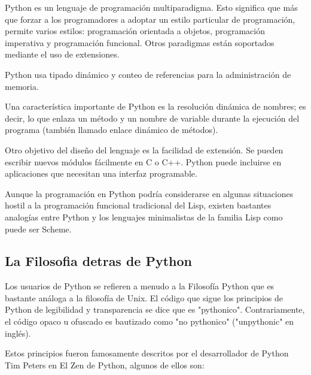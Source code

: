 Python es un lenguaje de programación multiparadigma. Esto significa que más
que forzar a los programadores a adoptar un estilo particular de programación,
permite varios estilos: programación orientada a objetos, programación imperativa
y programación funcional. Otros paradigmas están soportados mediante el uso
de extensiones.

Python usa tipado dinámico y conteo de referencias para la administración
de memoria.

Una característica importante de Python es la resolución dinámica de nombres;
 es decir, lo que enlaza un método y un nombre de variable durante la ejecución
  del programa (también llamado enlace dinámico de métodos).
  
Otro objetivo del diseño del lenguaje es la facilidad de extensión. Se pueden
escribir nuevos módulos fácilmente en C o C++. Python puede incluirse en
aplicaciones que necesitan una interfaz programable.

Aunque la programación en Python podría considerarse en algunas situaciones
hostil a la programación funcional tradicional del Lisp, existen bastantes
analogías entre Python y los lenguajes minimalistas de la familia Lisp como
puede ser Scheme.

\subsection{La Filosofia detras de Python}
Los usuarios de Python se refieren a menudo a la Filosofía Python que es bastante
análoga a la filosofía de Unix. El código que sigue los principios de Python de
legibilidad y transparencia se dice que es "pythonico". Contrariamente, el
código opaco u ofuscado es bautizado como "no pythonico" ("unpythonic" en inglés).

Estos principios fueron famosamente descritos por el desarrollador de Python Tim
Peters en El Zen de Python, algunos de ellos son:

